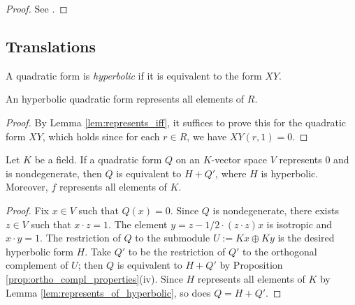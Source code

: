 \begin{proof}
	See \cite[\S IV.1.4, Lemma after Theorem 2]{Ser73}.
\end{proof}

\subsection{Translations}\label{subsec:translations}

\begin{definition}\label{def:hyperbolic}
\leanok
A quadratic form is \emph{hyperbolic} if it is equivalent to the form $XY$.
\end{definition}

\begin{lemma}\label{lem:represents_of_hyperbolic}
\leanok
{}
An hyperbolic quadratic form represents all elements of $R$.
\end{lemma}
\begin{proof}
\leanok
{}
By Lemma \ref{lem:represents_iff}, it suffices to prove this for the quadratic form $XY$, which holds since for each $r \in R$, we have $XY(r, 1) = 0$.
\end{proof}


\begin{proposition}\label{prop:sum_hyperbolic}
\leanok
{}
Let $K$ be a field. If a quadratic form $Q$ on an $K$-vector space $V$ represents $0$ and is nondegenerate, then $Q$ is equivalent to $H + Q'$, where $H$ is hyperbolic. Moreover, $f$ represents all elements of $K$.
\end{proposition}
\begin{proof}
\leanok
{}
Fix $x \in V$ such that $Q(x) = 0$. Since $Q$ is nondegenerate, there exists $z \in V$ such that $x \cdot z = 1$. The element $y = z - 1/2 \cdot(z\cdot z)x$ is isotropic and $x \cdot y = 1$.
The restriction of $Q$ to the submodule $U := Kx \oplus Ky$ is the desired hyperbolic form $H$. Take $Q'$ to be the restriction of $Q'$ to the orthogonal complement of $U$; then $Q$ is equivalent to $H + Q'$ by Proposition \ref{prop:ortho_compl_properties}(iv).
Since $H$ represents all elements of $K$ by Lemma \ref{lem:represents_of_hyperbolic}, so does $Q = H + Q'$.
\end{proof}

